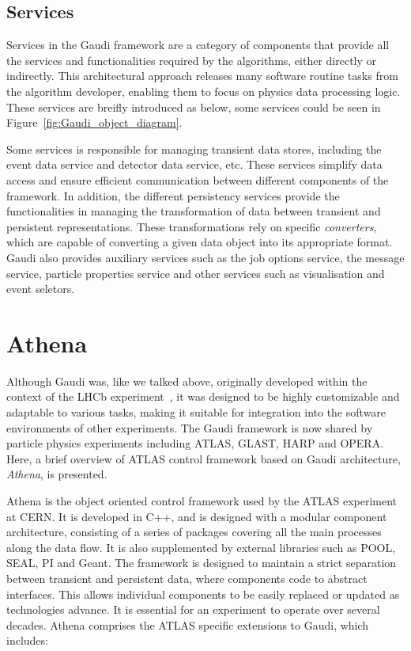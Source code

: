 \subsection{Services}
Services in the Gaudi framework are a category of components that provide all the services and functionalities required by the algorithms, either directly or indirectly. This architectural approach releases many software routine tasks from the algorithm developer, enabling them to focus on physics data processing logic. These services are breifly introduced as below, some services could be seen in Figure~\ref{fig:Gaudi_object_diagram}.

Some services is responsible for managing transient data stores, including the event data service and detector data service, etc. These services simplify data access and ensure efficient communication between different components of the framework. In addition, the different persistency services provide the functionalities in managing the transformation of data between transient and persistent representations. These transformations rely on specific \textit{converters}, which are capable of converting a given data object into its appropriate format. Gaudi also provides auxiliary services such as the job options service, the message service, particle properties service and other services such as visualisation and event seletors.

\section{Athena}
Although Gaudi was, like we talked above, originally developed within the context of the LHCb experiment~\cite{LHCb_tech}, it was designed to be highly customizable and adaptable to various tasks, making it suitable for integration into the software environments of other experiments. The Gaudi framework is now shared by particle physics experiments including ATLAS, GLAST, HARP and OPERA. Here, a brief overview of ATLAS control framework based on Gaudi architecture, \textit{Athena}, is presented.

Athena is the object oriented control framework used by the ATLAS experiment at CERN. It is developed in C++, and is designed with a modular component architecture, consisting of a series of packages covering all the main processes along the data flow. It is also supplemented by external libraries such as POOL, SEAL, PI and Geant.
The framework is designed to maintain a strict separation between transient and persistent data, where components code to abstract interfaces. This allows individual components to be easily replaced or updated as technologies advance. It is essential for an experiment to operate over several decades.
Athena comprises the ATLAS specific extensions to Gaudi, which includes:

